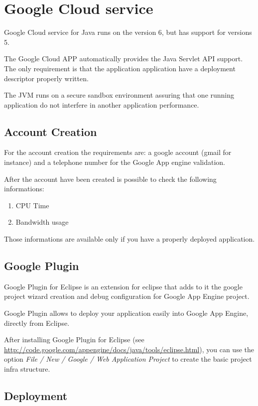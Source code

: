 \documentclass{article}
\begin{document}
\section{Google Cloud service}

Google Cloud service for Java runs on the version 6, but has support for versions 5. 

The Google Cloud APP automatically provides the Java Servlet API support. The only requirement is that the application application have a deployment descriptor properly written. 

The JVM runs on a secure sandbox environment assuring that one running application do not interfere in another application performance.

\subsection{Account Creation}

For the account creation the requirements are: a google account (gmail for instance) and a telephone number for the Google App engine validation.

After the account have been created is possible to check the following informations:
\begin{enumerate}
\item CPU Time
\item Bandwidth usage
\end{enumerate}

Those informations are available only if you have a properly deployed application.

\subsection{Google Plugin}

Google Plugin for Eclipse is an extension for eclipse that adds to it the google project wizard creation and debug configuration for Google App Engine project.

Google Plugin allows to deploy your application easily into Google App Engine, directly from Eclipse.

After installing Google Plugin for Eclipse (see \url{http://code.google.com/appengine/docs/java/tools/eclipse.html}), you can use the option \emph{File / New / Google / Web Application Project} to create the basic project infra structure.

\subsection{Deployment}
\end{document}

